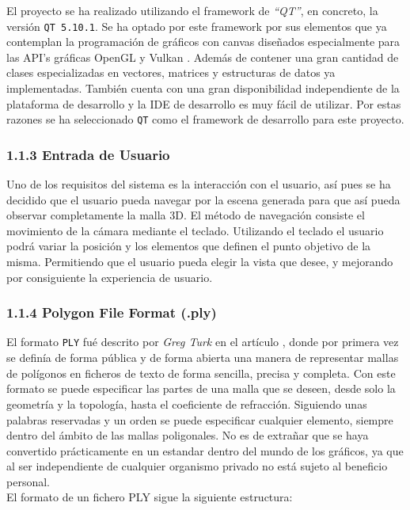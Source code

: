 El proyecto se ha realizado utilizando el framework de \textit{``QT''}, en concreto, la versión \texttt{QT 5.10.1}. Se ha optado por este framework por sus elementos que ya contemplan la programación de gráficos con canvas diseñados especialmente para las API's gráficas OpenGL y Vulkan \cite{GraphicsQt11}. Además de contener una gran cantidad de clases especializadas en vectores, matrices y estructuras de datos ya implementadas. También cuenta con una gran disponibilidad independiente de la plataforma de desarrollo y la IDE de desarrollo es muy fácil de utilizar. Por estas razones se ha seleccionado \texttt{QT} como el framework de desarrollo para este proyecto.


\subsubsection{1.1.3 Entrada de Usuario}
Uno de los requisitos del sistema es la interacción con el usuario, así pues se ha decidido que el usuario pueda navegar por la escena generada para que así pueda observar completamente la malla 3D. El método de navegación consiste el movimiento de la cámara mediante el teclado. Utilizando el teclado el usuario podrá variar la posición y los elementos que definen el punto objetivo de la misma. Permitiendo que el usuario pueda elegir la vista que desee, y mejorando por consiguiente la experiencia de usuario.

\subsubsection{1.1.4 Polygon File Format (.ply)}

El formato \texttt{PLY} fué descrito por \textit{Greg Turk} en el artículo \cite{turkPLYPolygonFormat}, donde por primera vez se definía de forma pública y de forma abierta una manera de representar mallas de polígonos en ficheros de texto de forma sencilla, precisa y completa. Con este formato se puede especificar las partes de una malla que se deseen, desde solo la geometría y la topología, hasta el coeficiente de refracción. Siguiendo unas palabras reservadas y un orden se puede especificar cualquier elemento, siempre dentro del ámbito de las mallas poligonales. No es de extrañar que se haya convertido prácticamente en un estandar dentro del mundo de los gráficos, ya que al ser independiente de cualquier organismo privado no está sujeto al beneficio personal.\\

El formato de un fichero PLY sigue la siguiente estructura:

